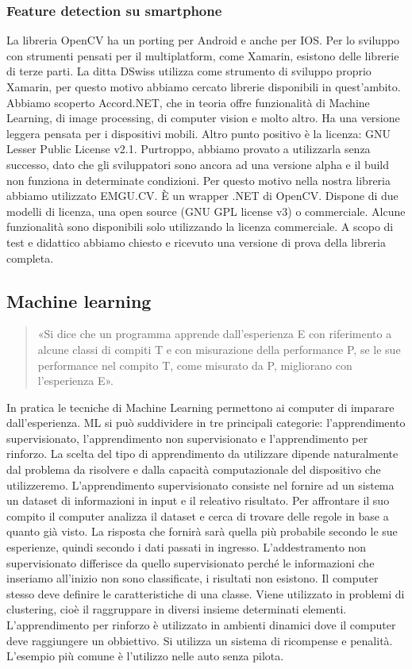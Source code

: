 \documentclass[twoside]{supsistudent}
\begin{document}
\subsubsection{Feature detection su smartphone}%
La libreria OpenCV ha un porting per Android e anche per IOS. Per lo sviluppo con strumenti pensati per il multiplatform, come Xamarin, esistono delle librerie di terze parti. La ditta DSwiss utilizza come strumento di sviluppo proprio Xamarin, per questo motivo abbiamo cercato librerie disponibili in quest'ambito. Abbiamo scoperto Accord.NET, che in teoria offre funzionalità di Machine Learning, di image processing, di computer vision e molto altro. Ha una versione leggera pensata per i dispositivi mobili. Altro punto positivo è la licenza: GNU Lesser Public License v2.1. Purtroppo, abbiamo provato a utilizzarla senza successo, dato che gli sviluppatori sono ancora ad una versione alpha e il build non funziona in determinate condizioni. Per questo motivo nella nostra libreria abbiamo utilizzato EMGU.CV. È un wrapper .NET di OpenCV. Dispone di due modelli di licenza, una open source (GNU GPL license v3) o commerciale. Alcune funzionalità sono disponibili solo utilizzando la licenza commerciale. A scopo di test e didattico abbiamo chiesto e ricevuto una versione di prova della libreria completa. 
\subsection{Machine learning}%
\begin{quote}
    «Si dice che un programma apprende dall’esperienza E con riferimento a alcune classi di compiti T e con misurazione della performance P, se le sue performance nel compito T, come misurato da P, migliorano con l’esperienza E».
\end{quote}
    In pratica le tecniche di Machine Learning permettono ai computer di imparare dall'esperienza. ML si può suddividere in tre principali categorie: l'apprendimento supervisionato, l'apprendimento non supervisionato e l'apprendimento per rinforzo. La scelta del tipo di apprendimento da utilizzare dipende naturalmente dal problema da risolvere e dalla capacità computazionale del dispositivo che utilizzeremo. 
    L'apprendimento supervisionato consiste nel fornire ad un sistema un dataset di informazioni in input e il releativo risultato. Per affrontare il suo compito il computer analizza il dataset e cerca di trovare delle regole in base a quanto già visto. La risposta che fornirà sarà quella più probabile secondo le sue esperienze, quindi secondo i dati passati in ingresso. 
    L'addestramento non supervisionato differisce da quello supervisionato perché le informazioni che inseriamo all'inizio non sono classificate, i risultati non esistono. Il computer stesso deve definire le caratteristiche di una classe. Viene utilizzato in problemi di clustering, cioè il raggruppare in diversi insieme determinati elementi.
    L'apprendimento per rinforzo è utilizzato in ambienti dinamici dove il computer deve raggiungere un obbiettivo. Si utilizza un sistema di ricompense e penalità. L'esempio più comune è l'utilizzo nelle auto senza pilota. 
    
\end{document}

